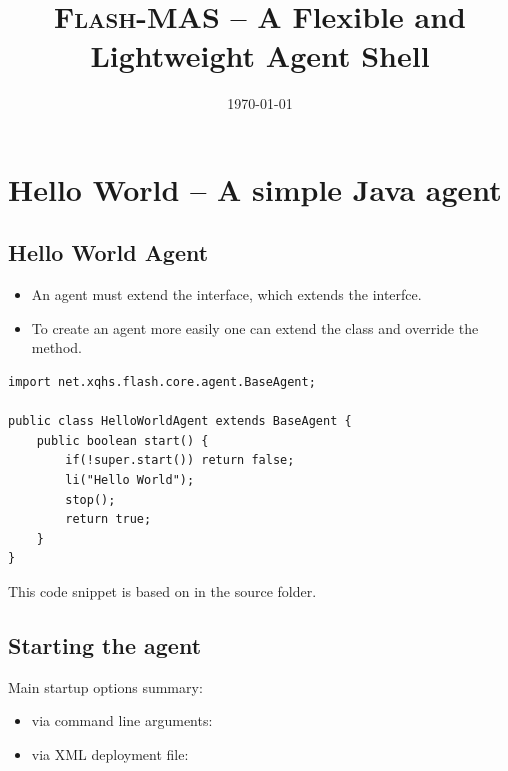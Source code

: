 \documentclass[10pt,aspectratio=169]{beamer}
\title{\textsc{Flash-MAS} -- A Flexible and Lightweight Agent Shell}
\institute{}
\date{\today}
\begin{document}
\ignoreslidenumber\dotitlepage\ignoreslidenumber\docontentspage[.6\pw]\modeheadline


\section[Hello World]{Hello World -- A simple Java agent}

\subsection{Hello World Agent}
\begin{frame}[fragile]

\begin{itemize}
    \item An agent must extend the  interface, which extends the  interfce.
    \item To create an agent more easily one can extend the  class and override the  method.
\end{itemize}

    

\begin{lstlisting}
import net.xqhs.flash.core.agent.BaseAgent;

public class HelloWorldAgent extends BaseAgent {
	public boolean start() {
		if(!super.start()) return false;
		li("Hello World");
		stop();
		return true;
	}
}
\end{lstlisting}

{\small This code snippet is based on  in the  source folder.}

\end{frame}

\subsection{Starting the agent}
\begin{frame}[fragile]

Main startup options summary: 

\begin{itemize}
    \item via command line arguments: \\

    \item via XML deployment file: \\
\end{itemize}


    
\end{frame}
\end{document}
